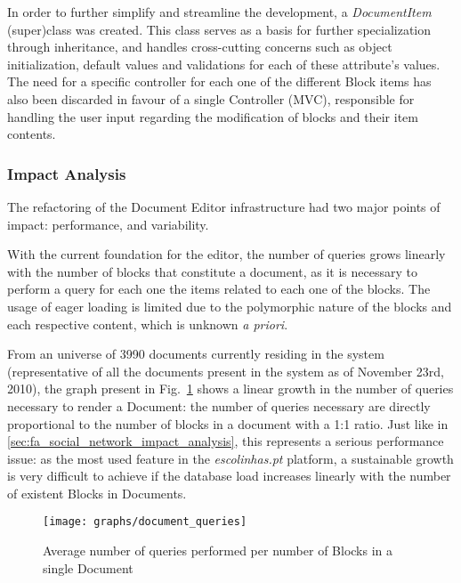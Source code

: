 In order to further simplify and streamline the development, a \emph{DocumentItem} (super)class was created. This class serves as a basis for further specialization through inheritance, and handles cross-cutting concerns such as object initialization, default values and validations for each of these attribute's values. The need for a specific controller for each one of the different Block items has also been discarded in favour of a single Controller (MVC), responsible for handling the user input regarding the modification of blocks and their item contents.

\subsubsection{Impact Analysis}\label{sec:fa_documents_impact_analysis}

The refactoring of the Document Editor infrastructure had two major points of impact: performance, and variability.


With the current foundation for the editor, the number of queries grows linearly with the number of blocks that constitute a document, as it is necessary to perform a query for each one the items related to each one of the blocks. The usage of eager loading is limited due to the polymorphic nature of the blocks and each respective content, which is unknown \emph{a priori}.

From an universe of 3990 documents currently residing in the system (representative of all the documents present in the system as of November 23rd, 2010), the graph present in Fig.~\ref{fig:queries_per_blocks_in_document} shows a linear growth in the number of queries necessary to render a Document: the number of queries necessary are directly proportional to the number of blocks in a document with a 1:1 ratio. Just like in \ref{sec:fa_social_network_impact_analysis}, this represents a serious performance issue: as the most used feature in the \emph{escolinhas.pt} platform, a sustainable growth is very difficult to achieve if the database load increases linearly with the number of existent Blocks in Documents.

\begin{figure}[h]
  \centering
  \texttt{[image: graphs/document\_queries]}
  \caption{Average number of queries performed per number of Blocks in a single Document}
  \label{fig:queries_per_blocks_in_document}
\end{figure}

